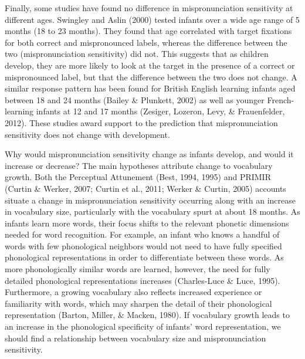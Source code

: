 \documentclass[man]{apa6}
\theoremstyle{definition}
\theoremstyle{definition}
\theoremstyle{definition}
\theoremstyle{remark}
\begin{document}
Finally, some studies have found no difference in mispronunciation
sensitivity at different ages. Swingley and Aslin (2000) tested infants
over a wide age range of 5 months (18 to 23 months). They found that age
correlated with target fixations for both correct and mispronounced
labels, whereas the difference between the two (mispronunciation
sensitivity) did not. This suggests that as children develop, they are
more likely to look at the target in the presence of a correct or
mispronounced label, but that the difference between the two does not
change. A similar response pattern has been found for British English
learning infants aged between 18 and 24 months (Bailey \& Plunkett,
2002) as well as younger French-learning infants at 12 and 17 months
(Zesiger, Lozeron, Levy, \& Frauenfelder, 2012). These studies award
support to the prediction that mispronunciation sensitivity does not
change with development.

Why would mispronunciation sensitivity change as infants develop, and
would it increase or decrease? The main hypotheses attribute change to
vocabulary growth. Both the Perceptual Attunement (Best, 1994, 1995) and
PRIMIR (Curtin \& Werker, 2007; Curtin et al., 2011; Werker \& Curtin,
2005) accounts situate a change in mispronunciation sensitivity
occurring along with an increase in vocabulary size, particularly with
the vocabulary spurt at about 18 months. As infants learn more words,
their focus shifts to the relevant phonetic dimensions needed for word
recognition. For example, an infant who knows a handful of words with
few phonological neighbors would not need to have fully specified
phonological representations in order to differentiate between these
words. As more phonologically similar words are learned, however, the
need for fully detailed phonological representations increases
(Charles-Luce \& Luce, 1995). Furthermore, a growing vocabulary also
reflects increased experience or familiarity with words, which may
sharpen the detail of their phonological representation (Barton, Miller,
\& Macken, 1980). If vocabulary growth leads to an increase in the
phonological specificity of infants' word representation, we should find
a relationship between vocabulary size and mispronunciation sensitivity.
\end{document}
